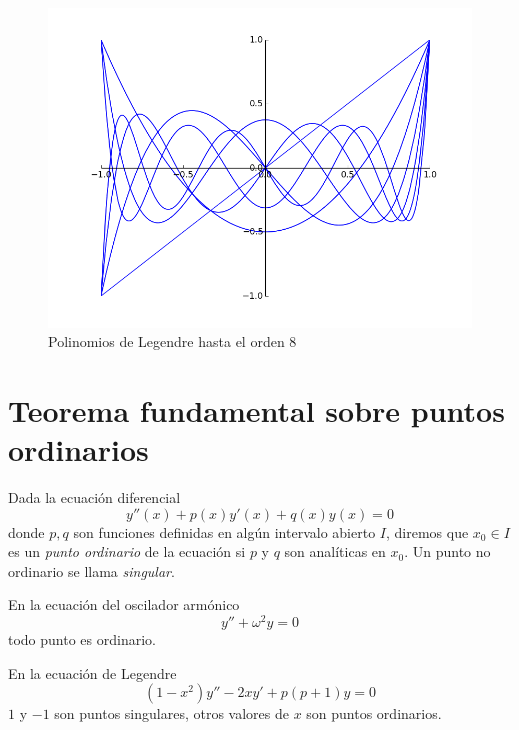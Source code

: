 \begin{ejemplo}{}
\begin{figure}[h]
\begin{center}
\includegraphics[scale=.25]{imagenes/legendre.png}
\caption{Polinomios de Legendre hasta el orden 8}
\end{center}
\end{figure}



\end{ejemplo}

\section{Teorema fundamental sobre puntos ordinarios}


\begin{definicion}{} Dada la ecuación diferencial
\[y''(x)+p(x)y'(x)+q(x)y(x)=0\]
donde $p,q$ son funciones   definidas en algún intervalo abierto $I$, diremos que $x_0\in I$ es un \emph{punto ordinario} de la ecuación si $p$ y $q$ son analíticas en $x_0$. Un punto no ordinario se llama \emph{singular}.
\end{definicion}

\begin{ejemplo}{} En la ecuación del oscilador armónico
\[y''+\omega^2 y=0 \]
todo punto es ordinario.
\end{ejemplo}

\begin{ejemplo}{} En la ecuación de Legendre
\[(1-x^2)y''-2xy'+p(p+1)y=0 \]
$1$ y $-1$ son puntos singulares, otros valores de $x$ son puntos ordinarios.
\end{ejemplo}

